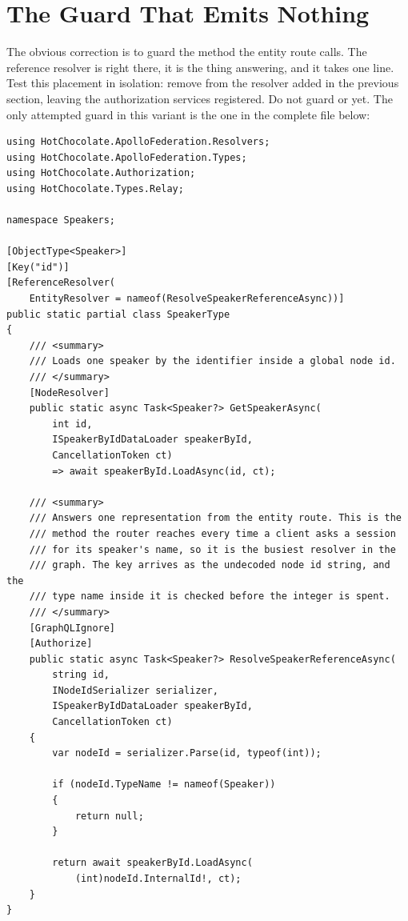 \section{The Guard That Emits Nothing}
\label{sec:ch12-the-guard-that-emits-nothing}

%
The obvious correction is to guard the method the entity route calls. The
reference resolver is right there, it is the thing answering, and it takes
one line. Test this placement in isolation: remove \code{[Authorize]} from
the  resolver added in the previous section, leaving the
authorization services registered. Do not guard  or
 yet. The only attempted guard in this variant is the one in
the complete file below:

\begin{verbatim}
using HotChocolate.ApolloFederation.Resolvers;
using HotChocolate.ApolloFederation.Types;
using HotChocolate.Authorization;
using HotChocolate.Types.Relay;

namespace Speakers;

[ObjectType<Speaker>]
[Key("id")]
[ReferenceResolver(
    EntityResolver = nameof(ResolveSpeakerReferenceAsync))]
public static partial class SpeakerType
{
    /// <summary>
    /// Loads one speaker by the identifier inside a global node id.
    /// </summary>
    [NodeResolver]
    public static async Task<Speaker?> GetSpeakerAsync(
        int id,
        ISpeakerByIdDataLoader speakerById,
        CancellationToken ct)
        => await speakerById.LoadAsync(id, ct);

    /// <summary>
    /// Answers one representation from the entity route. This is the
    /// method the router reaches every time a client asks a session
    /// for its speaker's name, so it is the busiest resolver in the
    /// graph. The key arrives as the undecoded node id string, and the
    /// type name inside it is checked before the integer is spent.
    /// </summary>
    [GraphQLIgnore]
    [Authorize]
    public static async Task<Speaker?> ResolveSpeakerReferenceAsync(
        string id,
        INodeIdSerializer serializer,
        ISpeakerByIdDataLoader speakerById,
        CancellationToken ct)
    {
        var nodeId = serializer.Parse(id, typeof(int));

        if (nodeId.TypeName != nameof(Speaker))
        {
            return null;
        }

        return await speakerById.LoadAsync(
            (int)nodeId.InternalId!, ct);
    }
}
\end{verbatim}

